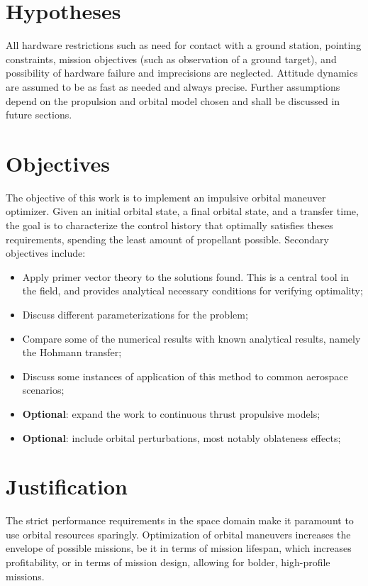 \section{Hypotheses}

All hardware restrictions such as need for contact with a ground station, pointing constraints, mission objectives (such as observation of a ground target), and possibility of hardware failure and imprecisions are neglected. Attitude dynamics are assumed to be as fast as needed and always precise. Further assumptions depend on the propulsion and orbital model chosen and shall be discussed in future sections.

\section{Objectives}

The objective of this work is to implement an impulsive orbital maneuver optimizer. Given an initial orbital state, a final orbital state, and a transfer time, the goal is to characterize the control history that optimally satisfies theses requirements, spending the least amount of propellant possible. Secondary objectives include:
\begin{itemize}
    \item Apply primer vector theory to the solutions found. This is a central tool in the field, and provides analytical necessary conditions for verifying optimality;
    \item Discuss different parameterizations for the problem;
    \item Compare some of the numerical results with known analytical results, namely the Hohmann transfer;
    \item Discuss some instances of application of this method to common aerospace scenarios;
    \item \textbf{Optional}: expand the work to continuous thrust propulsive models;
    \item \textbf{Optional}: include orbital perturbations, most notably oblateness effects;
\end{itemize}

\section{Justification}

The strict performance requirements in the space domain make it paramount to use orbital resources sparingly. Optimization of orbital maneuvers increases the envelope of possible missions, be it in terms of mission lifespan, which increases profitability, or in terms of mission design, allowing for bolder, high-profile missions. 

